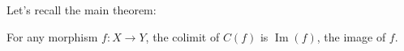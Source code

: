 \documentclass[notfinal]{jfrarticle}
\makeatletter
\def\dar[#1]#2{\ar@<-#2>[#1]\ar@<#2>[#1]} %
\def\tar[#1]#2{\ar@<#2>[#1]\ar@<0pt>[#1]\ar@<-#2>[#1]} %
\DeclareMathOperator{\im}{Im}
\makeatother
\begin{document}
Let's recall the main theorem:
\begin{thm}\label{cech}
  For any morphism $f : X \to Y$, the colimit of $C(f)$ is $\im(f)$,
  the image of $f$.
\end{thm}




\end{document}
